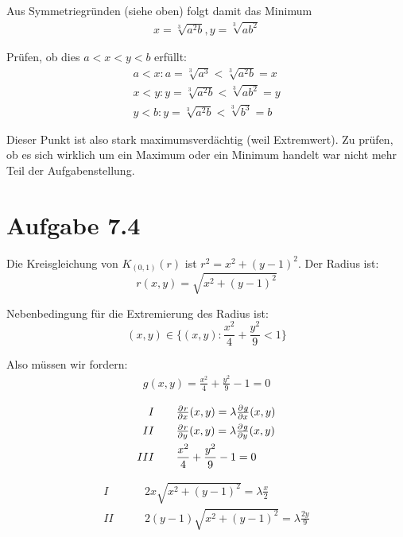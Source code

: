 \documentclass[a4paper,german,12pt,smallheadings]{scrartcl}
\begin{document}
  Aus Symmetriegründen (siehe oben) folgt damit das Minimum
  \begin{align*}
    x = \sqrt[3]{a^2 b}, y = \sqrt[3]{ab^2}
  \end{align*}

  Prüfen, ob dies $a<x<y<b$ erfüllt:
  \begin{align*}
    a<x : a = \sqrt[3]{a^3} < \sqrt[3]{a^2b} = x \\
    x<y : y = \sqrt[3]{a^2b} < \sqrt[3]{ab^2} = y \\
    y<b : y = \sqrt[3]{a^2b} < \sqrt[3]{b^3} = b
  \end{align*}

  Dieser Punkt ist also stark maximumsverdächtig (weil Extremwert). Zu prüfen,
  ob es sich wirklich um ein Maximum oder ein Minimum handelt war nicht mehr
  Teil der Aufgabenstellung.
\section*{Aufgabe 7.4}

Die Kreisgleichung von $K_{(0,1)}(r)$ ist $r^2 = x^2 + (y-1)^2$. Der Radius ist:
\begin{equation}
  r(x,y) = \sqrt{x^2 + (y-1)^2}
\end{equation}

Nebenbedingung für die Extremierung des Radius ist:
\begin{equation}
  (x,y) \in \{(x,y): \frac{x^2}{4} + \frac{y^2}{9} < 1\}
\end{equation}

Also müssen wir fordern:
\begin{align*}
  g(x,y) = \frac{x^2}{4} + \frac{y^2}{9} - 1 = 0
\end{align*}

\begin{align*}
  I   \qquad &\pd{r}{x}(x,y) = \lambda \pd{g}{x}(x,y) \\
  II  \qquad &\pd{r}{y}(x,y) = \lambda \pd{g}{y}(x,y) \\
  III \qquad &\frac{x^2}{4} + \frac{y^2}{9} - 1 = 0
\end{align*}

\begin{align*}
  I   \qquad &2x \sqrt{x^2 + (y-1)^2} = \lambda \frac{x}{2} \\
  II  \qquad &2(y-1) \sqrt{x^2 + (y-1)^2} = \lambda \frac{2y}{9} \\
\end{align*}
\end{document}
